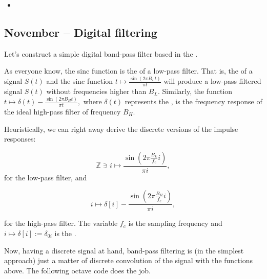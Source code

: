 \documentclass{article}
\begin{document}
\begin{itemize}
\item  {}
\end{itemize}

\subsection{November – Digital filtering}

Let's construct a simple digital band-pass filter based in the .

As everyone know, the sinc function is the  of a low-pass filter. That is, the  of a signal $ S(t)$ and the sinc function $ t \mapsto \frac{\sin(2 \pi B_L t)}{\pi t}$ will produce a low-pass filtered signal $S(t)$ without frequencies higher than $B_L$. Similarly, the function $ t \mapsto \delta(t) -  \frac{\sin(2 \pi B_H t)}{\pi t},$ where $ \delta(t)$ represents the , is the frequency response of the ideal high-pass filter of frequency $B_H$.

Heuristically, we can right away derive the discrete versions of the impulse responses:

$$
\mathbb{Z} \ni i \mapsto \frac{\sin(2 \pi \frac{B_L}{f_c} i)}{\pi i},
$$
for the low-pass filter, and

$$
i \mapsto \delta[i] - \frac{\sin(2 \pi \frac{B_H}{f_c} i)}{\pi i},
$$

for the high-pass filter. The variable $f_c$ is the sampling frequency and  $i \mapsto \delta[i] := \delta_{0i} $ is the .

Now, having a discrete signal at hand, band-pass filtering  is (in the simplest approach) just a matter of discrete convolution of the signal with the functions above. The following octave code does the job.
\end{document}
